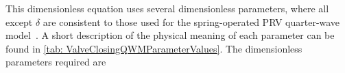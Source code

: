 This dimensionless equation uses several dimensionless parameters, where all except $\delta$ are consistent to those used for the spring-operated PRV quarter-wave model~\cite{Hos2016DynamicService}. A short description of the physical meaning of each parameter can be found in \cref{tab: ValveClosingQWMParameterValues}. The dimensionless parameters required are
